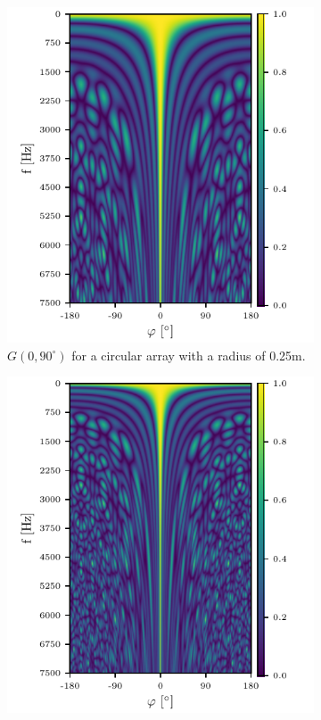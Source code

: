 \begin{figure}[h]
	\centering
	\begin{subfigure}[t]{0.45\textwidth}
		\centering
		\includegraphics[width=\textwidth]{images/3_source_localization/circ_f_sweep_0.pdf}
		\caption{$G(0, 90^\circ)$ for a circular array with a radius of 0.25m.}
		\label{ssl:fig:f_dep0}
	\end{subfigure}
	\hfill
	\begin{subfigure}[t]{0.45\textwidth}
		\centering
		\includegraphics[width=\textwidth]{images/3_source_localization/circ_f_sweep_1.pdf}

\end{subfigure}
\end{figure}
